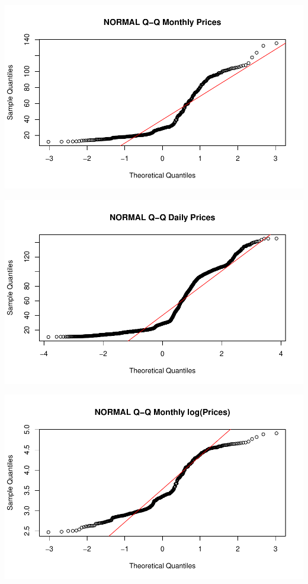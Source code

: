 \documentclass[11pt]{article}\usepackage[]{graphicx}\usepackage[]{color}
\makeatletter
\def\maxwidth{ %
  \ifdim\Gin@nat@width>\linewidth
    \linewidth
  \else
    \Gin@nat@width
  \fi
}
\newenvironment{knitrout}{}{} %
\makeatother
\begin{document}
\begin{knitrout}\footnotesize
{}\color{fgcolor}

{\centering \includegraphics[width=\maxwidth]{figure/norm-1} 

}




{\centering \includegraphics[width=\maxwidth]{figure/norm-2} 

}




{\centering \includegraphics[width=\maxwidth]{figure/norm-3} 

}
\end{knitrout}
\end{document}
